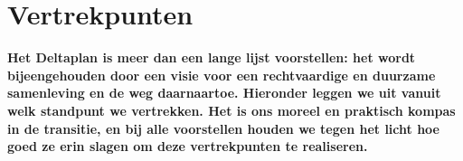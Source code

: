 \chapter{Vertrekpunten}

\begin{mdframed}[
	style=borderless-pink-pastel,
	innertopmargin=15pt,
	innerrightmargin=18pt,
	innerbottommargin=15pt,
	innerleftmargin=18pt
]

{ 
\bfseries \large Het Deltaplan is meer dan een lange lijst voorstellen: het wordt bijeengehouden door een visie voor een rechtvaardige en duurzame samenleving en de weg daarnaartoe. Hieronder leggen we uit vanuit welk standpunt we vertrekken. Het is ons moreel en praktisch kompas in de transitie, en bij alle voorstellen houden we tegen het licht hoe goed ze erin slagen om deze vertrekpunten te realiseren.

}
\end{mdframed}

\begin{multicols}{2}
















\end{multicols}
